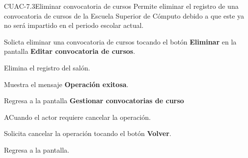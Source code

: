\begin{UseCase}{CUAC-7.3}{Eliminar convocatoria de cursos}{
		Permite eliminar el registro de una convocatoria de cursos de la Escuela Superior de Cómputo debido a que este ya no será impartido en el periodo escolar actual. \\
		}
			
	\end{UseCase}
	
	\begin{UCtrayectoria}
		
		\UCpaso [\UCactor] Solicta eliminar una convocatoria de cursos tocando el botón \textbf{Eliminar} en la pantalla \textbf{Editar convocatoria de cursos}. 
		
		\UCpaso Elimina el registro del salón.
		
		\UCpaso Muestra el mensaje \textbf{Operación exitosa}.
		
		\UCpaso Regresa a la pantalla \textbf{Gestionar convocatorias de curso}
		
	\end{UCtrayectoria}

	\begin{UCtrayectoriaA}{A}{Cuando el actor requiere cancelar la operación.}
		
		\UCpaso [\UCactor] Solicita cancelar la operación tocando el botón \textbf{Volver}.
		
		\UCpaso Regresa a la pantalla.
		
	\end{UCtrayectoriaA}